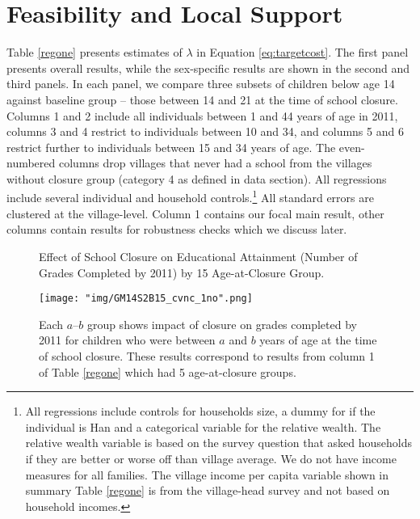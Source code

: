 \documentclass[12pt,english]{article}
\begin{document}
\section{Feasibility and Local Support}

Table \ref{regone} presents estimates of \(\lambda \) in Equation \ref{eq:targetcost}. The first panel presents overall results, while the sex-specific results are shown in the second and third panels. In each panel, we compare three subsets of children below age 14 against baseline group -- those between 14 and 21 at the time of school closure. Columns 1 and 2 include all individuals between 1 and 44 years of age in 2011, columns 3 and 4 restrict to individuals between 10 and 34, and columns 5 and 6 restrict further to individuals between 15 and 34 years of age. The even-numbered columns drop villages that never had a school from the villages without closure group (category 4 as defined in data section). All regressions include several individual and household controls.\footnote{All regressions include controls for households size, a dummy for if the individual is Han and a categorical variable for the relative wealth. The relative wealth variable is based on the survey question that asked households if they are better or worse off than village average. We do not have income measures for all families. The village income per capita variable shown in summary Table \ref{regone} is from the village-head survey and not based on household incomes.} All standard errors are clustered at the village-level. Column 1 contains our focal main result, other columns contain results for robustness checks which we discuss later.

\begin{figure}[h]
	\centering
	\caption{\small Effect of School Closure on Educational Attainment (Number of Grades Completed by 2011) by 15 Age-at-Closure Group.}
	\texttt{[image: "img/GM14S2B15\_cvnc\_1no".png]}
	\captionsetup{width=1.0\textwidth}
	\caption*{\footnotesize Each $a$--$b$ group shows impact of closure on grades completed by 2011 for children who were between $a$ and $b$ years of age at the time of school closure. These results correspond to results from column 1 of Table \ref{regone} which had 5 age-at-closure groups. \label{figoneb}}
\end{figure}
\end{document}

